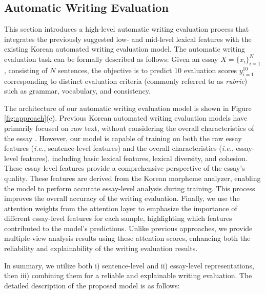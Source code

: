 \subsection{Automatic Writing Evaluation\label{sec:04_model_scoring}} 

This section introduces a high-level automatic writing evaluation process that integrates the previously suggested low- and mid-level lexical features with the existing Korean automated writing evaluation model. 
The automatic writing evaluation task can be formally described as follows: 
Given an essay \( X = \{x_i\}_{i=1}^{N} \), consisting of \( N \) sentences, the objective is to predict 10 evaluation scores \( y_{i=1}^{10} \) corresponding to distinct evaluation criteria (commonly referred to as \textit{rubric}) such as grammar, vocabulary, and consistency. 

The architecture of our automatic writing evaluation model is shown in Figure \ref{fig:approach}(c). 
Previous Korean automated writing evaluation models have primarily focused on raw text, without considering the overall characteristics of the essay \cite{lee2022argument, lee2023pasta}. 
However, our model is capable of training on both the raw essay features (\textit{i.e.}, sentence-level features) and the overall characteristics (\textit{i.e.}, essay-level features), including basic lexical features, lexical diversity, and cohesion.
These essay-level features provide a comprehensive perspective of the essay’s quality. 
These features are derived from the Korean morpheme analyzer, enabling the model to perform accurate essay-level analysis during training. 
This process improves the overall accuracy of the writing evaluation.
Finally, we use the attention weights from the attention layer to emphasize the importance of different essay-level features for each sample, highlighting which features contributed to the model's predictions. 
Unlike previous approaches, we provide multiple-view analysis results using these attention scores, enhancing both the reliability and explainability of the writing evaluation results.

In summary, we utilize both i) sentence-level and ii) essay-level representations, then iii) combining them for a reliable and explainable writing evaluation.
The detailed description of the proposed model is as follows:

